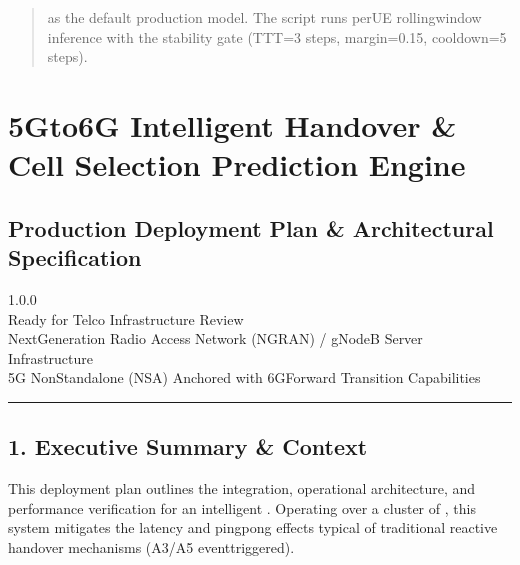 \documentclass[letterpaper,10pt,english]{sphinxmanual}
\begin{document}
\begin{quote}

\sphinxAtStartPar
{} as the default production model. The  script runs per\sphinxhyphen{}UE rolling\sphinxhyphen{}window inference with the stability gate (TTT=3 steps, margin=0.15, cooldown=5 steps).
\end{quote}

\sphinxstepscope


\chapter{5G\sphinxhyphen{}to\sphinxhyphen{}6G Intelligent Handover \& Cell Selection Prediction Engine}
\label{\detokenize{deployement:g-to-6g-intelligent-handover-cell-selection-prediction-engine}}\label{\detokenize{deployement::doc}}

\section{Production Deployment Plan \& Architectural Specification}
\label{\detokenize{deployement:production-deployment-plan-architectural-specification}}
\sphinxAtStartPar
{} 1.0.0\\
 Ready for Telco Infrastructure Review\\
 Next\sphinxhyphen{}Generation Radio Access Network (NG\sphinxhyphen{}RAN) / gNodeB Server Infrastructure\\
 5G Non\sphinxhyphen{}Standalone (NSA) Anchored with 6G\sphinxhyphen{}Forward Transition Capabilities


\bigskip\hrule\bigskip



\section{1. Executive Summary \& Context}
\label{\detokenize{deployement:executive-summary-context}}
\sphinxAtStartPar
This deployment plan outlines the integration, operational architecture, and performance verification for an intelligent . Operating over a cluster of , this system mitigates the latency and ping\sphinxhyphen{}pong effects typical of traditional reactive handover mechanisms (A3/A5 event\sphinxhyphen{}triggered).
\end{document}
